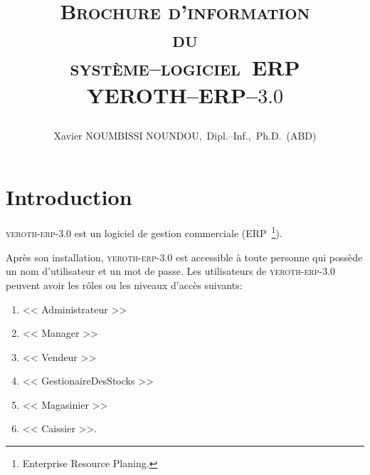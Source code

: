 \documentclass[a4paper, 10pt, twocolumn]{article}
\newcommand{\pos}{syst\`eme--logiciel~ERP\xspace}
\newcommand{\yerenpos}{\textcolor{yerenColorBlue}{\sc YEROTH--ERP--$3.0$}\xspace}
\newcommand{\myfullacademicname}{Xavier NOUMBISSI NOUNDOU,~Dipl.--Inf.,~Ph.D.~(ABD)\xspace}
\newcommand{\yeren}{\textsc{yeroth-erp-3.0}\xspace}
\newcommand{\manager}{<< Manager >>\xspace}
\newcommand{\caissier}{<< Caissier >>\xspace}
\newcommand{\administrateur}{<< Administrateur >>\xspace}
\newcommand{\magasinier}{<< Magasinier >>\xspace}
\newcommand{\vendeur}{<< Vendeur >>\xspace}
\newcommand{\gestionairedestocks}{<< GestionaireDesStocks >>\xspace}
\begin{document}

\title{
\vspace{-1.65em}
\textcolor{medgreen}{\textsc{Brochure d'information \\
										du \\
									 \pos \\ \vspace{1em}
									 \yerenpos}}
									 \author{\myfullacademicname}
}

\date{} 
\maketitle
\thispagestyle{fancy}



\vspace{-1.1em}
\section{Introduction}
\vspace{-0.9em}
\yeren est un logiciel de gestion commerciale
(ERP~\footnote{Enterprise Resource Planing.}).

Apr\`es son installation, \yeren est accessible \`a
toute personne qui poss\`ede un nom d'utilisateur et
un mot de passe.
Les utilisateurs de \yeren peuvent avoir les r\^oles ou 
les niveaux d'acc\`es suivants:
\begin{enumerate}[1)]
	\itemsep -0.6em
	\item \administrateur
	\item \manager
	\item \vendeur
	\item \gestionairedestocks
	\item \magasinier
	\item \caissier.
\end{enumerate}
\end{document}
